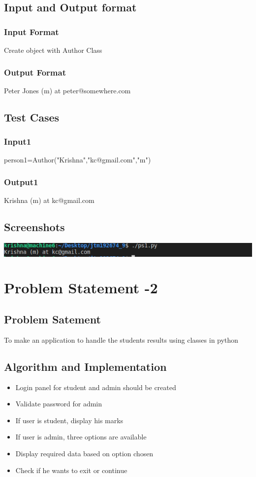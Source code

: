 \documentclass[12pt]{article}
\begin{document}
  \subsection{Input and Output format}
  \subsubsection{Input Format} 
Create object with Author Class\\


\subsubsection{Output Format}
Peter Jones (m) at peter@somewhere.com

  \subsection{Test Cases}
  \subsubsection{Input1}
 person1=Author("Krishna","kc@gmail.com","m")\\

    
  \subsubsection{Output1}
 Krishna (m) at kc@gmail.com\\

\subsection{Screenshots}
\includegraphics[width=\linewidth]{lab9_2.png}
\newpage
  \section{Problem Statement -2}
  \subsection{Problem Satement}
    To make an application to handle the students results using classes in python 



  \subsection{Algorithm and Implementation}
  \begin{itemize}
  \item Login panel for student and admin should be created
  \item Validate password for admin
  \item If user is student, display his marks
  \item If user is admin, three options are available
  \item Display required data based on option chosen
  \item Check if he wants to exit or continue
  \end{itemize}
\end{document}
